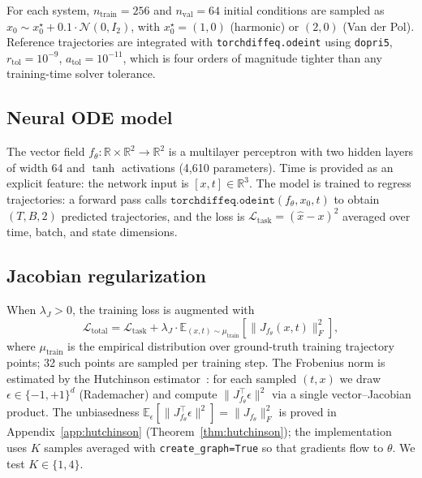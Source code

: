 \documentclass[11pt]{article}
\theoremstyle{plain}
\theoremstyle{definition}
\newcommand{\E}{\mathbb{E}}
\newcommand{\R}{\mathbb{R}}
\newcommand{\fjac}{J_{f_\theta}}
\begin{document}
For each system, $n_\text{train} = 256$ and $n_\text{val} = 64$ initial
conditions are sampled as $x_0 \sim x_0^\star + 0.1 \cdot \mathcal{N}(0, I_2)$,
with $x_0^\star = (1, 0)$ (harmonic) or $(2, 0)$ (Van der Pol). Reference
trajectories are integrated with \texttt{torchdiffeq.odeint} using
\texttt{dopri5}, $r_\text{tol} = 10^{-9}$, $a_\text{tol} = 10^{-11}$, which is
four orders of magnitude tighter than any training-time solver tolerance.

\subsection{Neural ODE model}
\label{sec:model}

The vector field $f_\theta \colon \R \times \R^2 \to \R^2$ is a multilayer
perceptron with two hidden layers of width 64 and $\tanh$ activations
(4{,}610 parameters). Time is provided as an explicit feature: the network
input is $[x, t] \in \R^3$. The model is trained to regress trajectories: a
forward pass calls $\texttt{torchdiffeq.odeint}(f_\theta, x_0, t)$ to obtain
$(T, B, 2)$ predicted trajectories, and the loss is
$\mathcal{L}_\text{task} = (\hat x - x)^2$ averaged over time, batch, and
state dimensions.

\subsection{Jacobian regularization}
\label{sec:reg}

When $\lambda_J > 0$, the training loss is augmented with
\begin{equation}
\mathcal{L}_\text{total} = \mathcal{L}_\text{task}
  + \lambda_J \cdot \E_{(x, t) \sim \mu_\text{train}}
    \!\left[\|\fjac(x, t)\|_F^2\right],
\label{eq:loss}
\end{equation}
where $\mu_\text{train}$ is the empirical distribution over ground-truth
training trajectory points; 32 such points are sampled per training step. The
Frobenius norm is estimated by the Hutchinson
estimator~\citep{hutchinson1990stochastic}: for each sampled $(t, x)$ we draw
$\epsilon \in \{-1, +1\}^d$ (Rademacher) and compute
$\|\fjac^\top \epsilon\|^2$ via a single vector--Jacobian product. The
unbiasedness $\E_\epsilon[\|\fjac^\top \epsilon\|^2] = \|\fjac\|_F^2$ is
proved in Appendix~\ref{app:hutchinson} (Theorem~\ref{thm:hutchinson}); the
implementation uses $K$ samples averaged with \texttt{create\_graph=True} so
that gradients flow to $\theta$. We test $K \in \{1, 4\}$.
\end{document}
